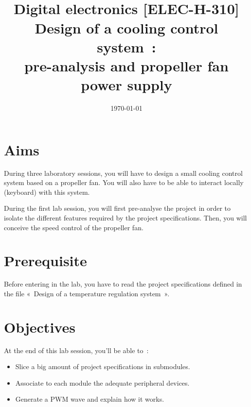 \documentclass[11pt,a4paper]{article}
\date{\vspace{-1.7cm}\mydate\today}
\title{\vspace{-2cm}\labonumber \\ Digital electronics [ELEC-H-310]\\Design of a cooling control system~: \\ pre-analysis and propeller fan power supply\ifthenelse{\boolean{corrige}}{~\\Corrigé}{}}
\theoremstyle{definition}%
\begin{document}
\pagestyle{empty}
\maketitle





\section*{Aims}
During three laboratory sessions, you will have to design a small cooling control system based on a propeller fan.
You will also have to be able to interact locally (keyboard) with this system.

During the first lab session, you will first pre-analyse the project in order to isolate the different features required by the project specifications.
Then, you will conceive the speed control of the propeller fan.

\section*{Prerequisite}
Before entering in the lab, you have to read the project specifications defined in the file «~Design of a temperature regulation system~».


\section*{Objectives}
At the end of this lab session, you'll be able to~:
\begin{itemize}
	\item Slice a big amount of project specifications in submodules.
	\item Associate to each module the adequate peripheral devices.
	\item Generate a PWM wave and explain how it works.
\end{itemize}


\newpage


\end{document}
